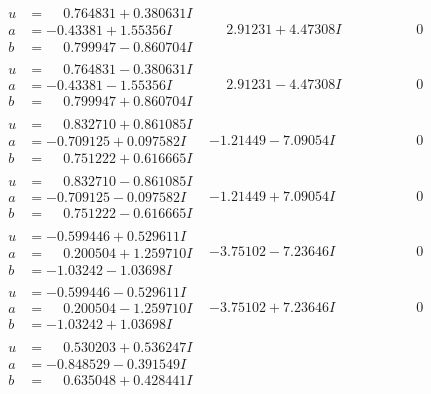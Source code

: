 \documentclass[1p]{elsarticle_modified}
\theoremstyle{definition}
\begin{document}
$$\begin{array}{c|c|c}
\begin{aligned}
u &= \phantom{-}0.764831 + 0.380631 I \\
a &= -0.43381 + 1.55356 I \\
b &= \phantom{-}0.799947 - 0.860704 I\end{aligned}
 & \phantom{-}2.91231 + 4.47308 I & \phantom{-0.000000 } 0 \\ \hline\begin{aligned}
u &= \phantom{-}0.764831 - 0.380631 I \\
a &= -0.43381 - 1.55356 I \\
b &= \phantom{-}0.799947 + 0.860704 I\end{aligned}
 & \phantom{-}2.91231 - 4.47308 I & \phantom{-0.000000 } 0 \\ \hline\begin{aligned}
u &= \phantom{-}0.832710 + 0.861085 I \\
a &= -0.709125 + 0.097582 I \\
b &= \phantom{-}0.751222 + 0.616665 I\end{aligned}
 & -1.21449 - 7.09054 I & \phantom{-0.000000 } 0 \\ \hline\begin{aligned}
u &= \phantom{-}0.832710 - 0.861085 I \\
a &= -0.709125 - 0.097582 I \\
b &= \phantom{-}0.751222 - 0.616665 I\end{aligned}
 & -1.21449 + 7.09054 I & \phantom{-0.000000 } 0 \\ \hline\begin{aligned}
u &= -0.599446 + 0.529611 I \\
a &= \phantom{-}0.200504 + 1.259710 I \\
b &= -1.03242 - 1.03698 I\end{aligned}
 & -3.75102 - 7.23646 I & \phantom{-0.000000 } 0 \\ \hline\begin{aligned}
u &= -0.599446 - 0.529611 I \\
a &= \phantom{-}0.200504 - 1.259710 I \\
b &= -1.03242 + 1.03698 I\end{aligned}
 & -3.75102 + 7.23646 I & \phantom{-0.000000 } 0 \\ \hline\begin{aligned}
u &= \phantom{-}0.530203 + 0.536247 I \\
a &= -0.848529 - 0.391549 I \\
b &= \phantom{-}0.635048 + 0.428441 I\end{aligned}

\end{array}$$
\end{document}
